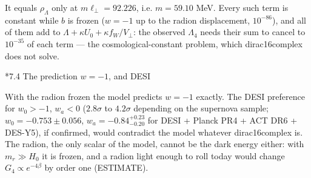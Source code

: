\documentclass[10pt,a4paper]{article}
\makeatletter
\renewcommand\subsection{\@startsection{subsection}{2}{\z@}{-3.25ex\@plus -1ex \@minus -.2ex}{1.5ex \@plus .2ex}{\normalfont\large\bfseries\raggedright}}
\makeatother
\begin{document}
It equals $\rho_\Lambda$ only at $m\ell_\perp=92.226$, i.e. $m=59.10$ MeV. Every such term is constant while $b$ is frozen ($w=-1$ up to the radion displacement, $10^{-86}$), and all of them add to $\Lambda+\kappa U_0+\kappa f_W/V_\perp$: the observed $\Lambda_4$ needs their sum to cancel to $10^{-35}$ of each term — the cosmological-constant problem, which dirac16complex does not solve.

\subsection*{7.4 The prediction \texorpdfstring{$w=-1$}{w=-1}, and DESI}
With the radion frozen the model predicts $w=-1$ exactly. The DESI preference for $w_0>-1$, $w_a<0$ ($2.8\sigma$ to $4.2\sigma$ depending on the supernova sample; $w_0=-0.753\pm0.056$, $w_a=-0.84^{+0.23}_{-0.20}$ for DESI + Planck PR4 + ACT DR6 + DES-Y5), if confirmed, would contradict the model whatever dirac16complex is. The radion, the only scalar of the model, cannot be the dark energy either: with $m_r\gg H_0$ it is frozen, and a radion light enough to roll today would change $G_4\propto e^{-4\beta}$ by order one (ESTIMATE).
\end{document}
